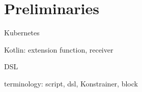 \setlength{\parindent}{0pt}
\setlength{\parskip}{0.6em}

\chapter{Preliminaries}
\label{chap:prerequisites}

Kubernetes

Kotlin: extension function, receiver

DSL

terminology: script, dsl, Konstrainer, block

